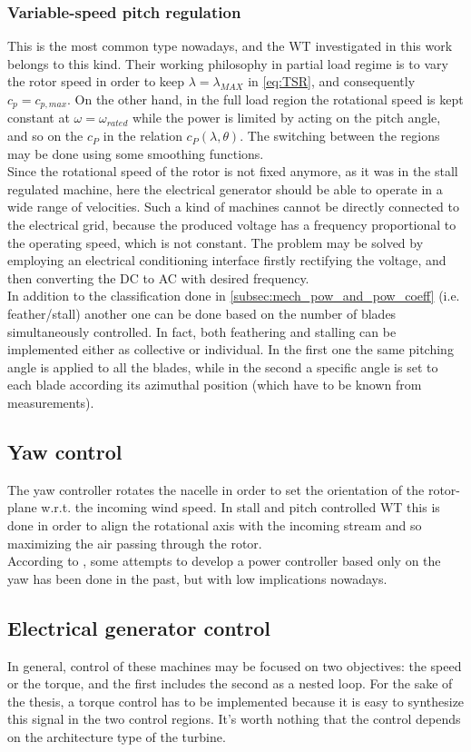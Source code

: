 \subsubsection{Variable-speed pitch regulation}
This is the most common type nowadays, and the \acrshort{WT} investigated in this work belongs to this kind. Their working philosophy in partial load regime is to vary the rotor speed in order to keep $\lambda = \lambda_{MAX}$ in \autoref{eq:TSR}, and consequently $c_p=c_{p,max}$. On the other hand, in the full load region the rotational speed is kept constant at $\omega = \omega_{rated}$ while the power is limited by acting on the pitch angle, and so on the $c_P$ in the relation $c_P(\lambda, \theta)$. The switching between the regions may be done using some smoothing functions. \\
Since the rotational speed of the rotor is not fixed anymore, as it was in the stall regulated machine, here the electrical generator should be able to operate in a wide range of velocities. Such a kind of machines cannot be directly connected to the electrical grid, because the produced voltage has a frequency proportional to the operating speed, which is not constant. The problem may be solved by employing an electrical conditioning interface firstly rectifying the voltage, and then converting the DC to AC with desired frequency. \\
In addition to the classification done in \ref{subsec:mech_pow_and_pow_coeff} (i.e. feather/stall) another one can be done based on the number of blades simultaneously controlled. In fact, both feathering and stalling can be implemented either as collective or individual. In the first one the same pitching angle is applied to all the blades, while in the second a specific angle is set to each blade according its azimuthal position (which have to be known from measurements).

\subsection{Yaw control}
The yaw controller rotates the nacelle in order to set the orientation of the rotor-plane w.r.t. the incoming wind speed. In stall and pitch controlled \acrshort{WT} this is done in order to align the rotational axis with the incoming stream and so maximizing the air passing through the rotor. \\
According to \cite{Aerodynamics_of_wind_turbines}, some attempts to develop a power controller based only on the yaw has been done in the past, but with low implications nowadays. 

\subsection{Electrical generator control}\label{subsec:PMSM_control}
In general, control of these machines may be focused on two objectives: the speed or the torque, and the first includes the second as a nested loop. For the sake of the thesis, a torque control has to be implemented because it is easy to synthesize this signal in the two control regions. It's worth nothing that the control depends on the architecture type of the turbine. 